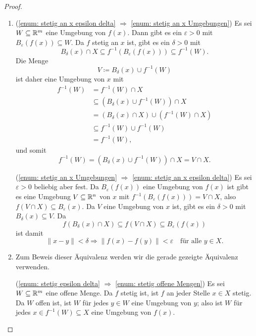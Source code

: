 \documentclass[a4paper,10pt]{article}
\begin{document}
\begin{proof}
 \begin{enumerate}
  \item
   (\ref{enum: stetig an x epsilon delta} $\Rightarrow$ \ref{enum: stetig an x Umgebungen}) Es sei $W \subseteq \mathbb{R}^m$ eine Umgebung von $f(x)$. Dann gibt es ein $\varepsilon > 0$ mit $B_\varepsilon(f(x)) \subseteq W$. Da $f$ stetig an $x$ ist, gibt es ein $\delta > 0$ mit
   \[
    B_\delta(x) \cap X \subseteq f^{-1}(B_\varepsilon(f(x))) \subseteq f^{-1}(W).
   \]
   Die Menge
   \[
    V \coloneqq B_\delta(x) \cup f^{-1}(W)
   \]
   ist daher eine Umgebung von $x$ mit
   \begin{align*}
    f^{-1}(W)
    &= f^{-1}(W) \cap X \\
    &\subseteq \left( B_\delta(x) \cup f^{-1}(W) \right) \cap X \\
    &= (B_\delta(x) \cap X) \cup (f^{-1}(W) \cap X) \\
    &\subseteq f^{-1}(W) \cup f^{-1}(W) \\
    &= f^{-1}(W),
   \end{align*}
   und somit
   \[
    f^{-1}(W) = (B_\delta(x) \cup f^{-1}(W)) \cap X = V \cap X.
   \]
   
   (\ref{enum: stetig an x Umgebungen} $\Rightarrow$ \ref{enum: stetig an x epsilon delta}) Es sei $\varepsilon > 0$ beliebig aber fest. Da $B_\varepsilon(f(x))$ eine Umgebung von $f(x)$ ist gibt es eine Umgebung $V \subseteq \mathbb{R}^n$ von $x$ mit $f^{-1}(B_\varepsilon(f(x))) = V \cap X$, also $f(V \cap X) \subseteq B_\varepsilon(x)$. Da $V$ eine Umgebung von $x$ ist, gibt es ein $\delta > 0$ mit $B_\delta(x) \subseteq V$. Da
   \[
    f(B_\delta(x) \cap X) \subseteq f(V \cap X) \subseteq B_\varepsilon(f(x))
   \]
   ist damit
   \[
    \|x-y\| < \delta \Rightarrow \|f(x)-f(y)\| < \varepsilon \quad \text{für alle $y \in X$}.
   \]
  \item
   Zum Beweis dieser Äquivalenz werden wir die gerade gezeigte Äquivalenz verwenden.
   
   (\ref{enum: stetig epsilon delta} $\Rightarrow$ \ref{enum: stetig offene Mengen}) Es sei $W \subseteq \mathbb{R}^m$ eine offene Menge. Da $f$ stetig ist, ist $f$ an jeder Stelle $x \in X$ stetig. Da $W$ offen ist, ist $W$ für jedes $y \in W$ eine Umgebung von $y$; also ist $W$ für jedes $x \in f^{-1}(W) \subseteq X$ eine Umgebung von $f(x)$.
   

\end{enumerate}
\end{proof}
\end{document}
